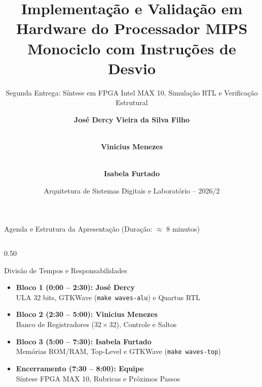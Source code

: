 \documentclass[aspectratio=169, 10pt]{beamer}
\title[MIPS Monociclo com Jumps]{Implementação e Validação em Hardware do Processador MIPS Monociclo com Instruções de Desvio}
\subtitle{Segunda Entrega: Síntese em FPGA Intel MAX 10, Simulação RTL e Verificação Estrutural}
\author[Dercy, Vinicius, Isabela]{%
  \textbf{José Dercy Vieira da Silva Filho} \and \\
  \textbf{Vinicius Menezes} \and \\
  \textbf{Isabela Furtado}%
}
\institute[UFAM / FEEC]{%
  Faculdade de Engenharia Elétrica e da Computação -- FEEC \\
  Universidade Federal do Amazonas -- UFAM \\
  Manaus, Brasil
}
\date[Outubro 2026]{Arquitetura de Sistemas Digitais e Laboratório -- 2026/2}
\begin{document}
\begin{frame}
  \titlepage
\end{frame}

\begin{frame}{Agenda e Estrutura da Apresentação (Duração: $\approx$ 8 minutos)}
  \begin{columns}[T]
    \begin{column}{0.50\textwidth}
      \begin{block}{Divisão de Tempos e Responsabilidades}
        \scriptsize
        \begin{itemize}\setlength{\itemsep}{2pt}
          \item \textbf{Bloco 1 (0:00 -- 2:30): José Dercy}\\
            {\color{gray!80!black}ULA 32 bits, GTKWave (\texttt{make waves-alu}) e Quartus RTL}
          \item \textbf{Bloco 2 (2:30 -- 5:00): Vinicius Menezes}\\
            {\color{gray!80!black}Banco de Registradores ($32 \times 32$), Controle e Saltos}
          \item \textbf{Bloco 3 (5:00 -- 7:30): Isabela Furtado}\\
            {\color{gray!80!black}Memórias ROM/RAM, Top-Level e GTKWave (\texttt{make waves-top})}
          \item \textbf{Encerramento (7:30 -- 8:00): Equipe}\\
            {\color{gray!80!black}Síntese FPGA MAX 10, Rubricas e Próximos Passos}
        \end{itemize}
      \end{block}
    \end{column}


\end{columns}
\end{frame}
\end{document}
